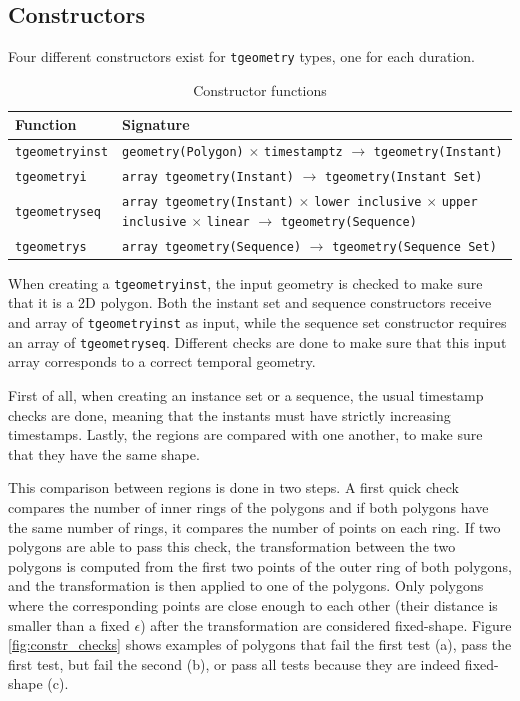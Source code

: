\subsection{Constructors}
\label{section:constructors}

Four different constructors exist for \lstinline+tgeometry+ types, one for each duration.

\begin{table}[htb]
    \centering
    \begin{tabularx}{\textwidth}{|l|X|}
    \hline
    \textbf{Function}   & \textbf{Signature} \\ 
    \hline
    \lstinline+tgeometryinst+       & \lstinline+geometry(Polygon)+ $\times$ \lstinline+timestamptz+ $\rightarrow$ \lstinline+tgeometry(Instant)+ \\
    \hline
    \lstinline+tgeometryi+          & \lstinline+array tgeometry(Instant)+ $\rightarrow$ \lstinline+tgeometry(Instant Set)+ \\
    \hline
    \lstinline+tgeometryseq+        & \lstinline+array tgeometry(Instant)+ $\times$ \lstinline+lower inclusive+ $\times$ \lstinline+upper inclusive+ $\times$ \lstinline+linear+ $\rightarrow$ \lstinline+tgeometry(Sequence)+ \\
    \hline
    \lstinline+tgeometrys+          & \lstinline+array tgeometry(Sequence)+ $\rightarrow$ \lstinline+tgeometry(Sequence Set)+ \\
    \hline
    \end{tabularx}
    \caption{Constructor functions}
    \label{table:constructor_funcs}
\end{table}

When creating a \lstinline+tgeometryinst+, the input geometry is checked to make sure that it is a 2D polygon. Both the instant set and sequence constructors receive and array of \lstinline+tgeometryinst+ as input, while the sequence set constructor requires an array of \lstinline+tgeometryseq+. Different checks are done to make sure that this input array corresponds to a correct temporal geometry.

First of all, when creating an instance set or a sequence, the usual timestamp checks are done, meaning that the instants must have strictly increasing timestamps. Lastly, the regions are compared with one another, to make sure that they have the same shape.

This comparison between regions is done in two steps. A first quick check compares the number of inner rings of the polygons and if both polygons have the same number of rings, it compares the number of points on each ring. If two polygons are able to pass this check, the transformation between the two polygons is computed from the first two points of the outer ring of both polygons, and the transformation is then applied to one of the polygons. Only polygons where the corresponding points are close enough to each other (their distance is smaller than a fixed $\epsilon$) after the transformation are considered fixed-shape. Figure \ref{fig:constr_checks} shows examples of polygons that fail the first test (a), pass the first test, but fail the second (b), or pass all tests because they are indeed fixed-shape (c).

